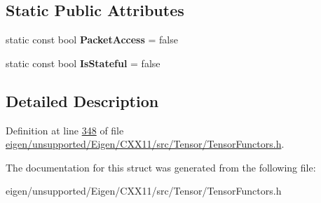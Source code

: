 \subsection*{Static Public Attributes}
\begin{DoxyCompactItemize}
\item 
\mbox{\label{struct_eigen_1_1internal_1_1_and_reducer_a669d12915435f7a14c5d72e40b431050}} 
static const bool {\bfseries Packet\+Access} = false
\item 
\mbox{\label{struct_eigen_1_1internal_1_1_and_reducer_a5ce8e71d10863c242a4fe08710c3c136}} 
static const bool {\bfseries Is\+Stateful} = false
\end{DoxyCompactItemize}


\subsection{Detailed Description}


Definition at line \hyperlink{eigen_2unsupported_2_eigen_2_c_x_x11_2src_2_tensor_2_tensor_functors_8h_source_l00348}{348} of file \hyperlink{eigen_2unsupported_2_eigen_2_c_x_x11_2src_2_tensor_2_tensor_functors_8h_source}{eigen/unsupported/\+Eigen/\+C\+X\+X11/src/\+Tensor/\+Tensor\+Functors.\+h}.



The documentation for this struct was generated from the following file\+:\begin{DoxyCompactItemize}
\item 
eigen/unsupported/\+Eigen/\+C\+X\+X11/src/\+Tensor/\+Tensor\+Functors.\+h\end{DoxyCompactItemize}
